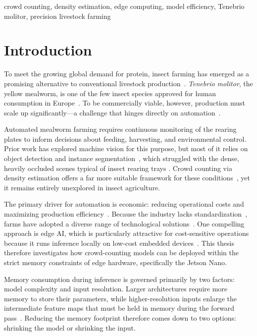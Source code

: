 \documentclass[conference]{IEEEtran}
\begin{document}
\begin{IEEEkeywords}
crowd counting, density estimation, edge computing, model efficiency, Tenebrio molitor, precision livestock farming
\end{IEEEkeywords}

\section{Introduction}\label{sec:intro}
To meet the growing global demand for protein, insect farming has emerged as a
promising alternative to conventional livestock production~\cite{vanhuis2013}.
\textit{Tenebrio molitor}, the yellow mealworm, is one of the few insect species
approved for human consumption in Europe~\cite{eu2021tenebrio}. To be
commercially viable, however, production must scale up significantly---a challenge
that hinges directly on automation~\cite{rumpold2013}.

Automated mealworm farming requires continuous monitoring of the rearing plates
to inform decisions about feeding, harvesting, and environmental control. Prior
work has explored machine vision for this purpose, but most of it relies on
object detection and instance segmentation~\cite{majewski2022multipurpose}, which struggled with the dense,
heavily occluded scenes typical of insect rearing trays \cite{Papadopoulos2024TenebrioVision}. Crowd counting via
density estimation offers a far more suitable framework for these
conditions~\cite{Sindagi2017ASO}, yet it remains entirely unexplored in insect
agriculture.

The primary driver for automation is economic: reducing operational costs and
maximizing production efficiency~\cite{rumpold2013}. Because the industry lacks
standardization~\cite{NAWOYA2024108503}, farms have adopted a diverse range of
technological solutions~\cite{CoRoSect2022AdvancedArchitecture,
kroncke2020automation}. One compelling approach is edge AI, which is
particularly attractive for cost-sensitive operations because it runs inference
locally on low-cost embedded devices~\cite{angulo2025realtimecricketsortingsex}.
This thesis therefore investigates how crowd-counting models can be deployed
within the strict memory constraints of edge hardware, specifically the Jetson Nano.

Memory consumption during inference is governed primarily by two factors: model
complexity and input resolution. Larger architectures require more memory to
store their parameters, while higher-resolution inputs enlarge the intermediate
feature maps that must be held in memory during the forward
pass~\cite{Chao2019HarDNet}. Reducing the memory footprint therefore comes down
to two options: shrinking the model or shrinking the input.
\end{document}
